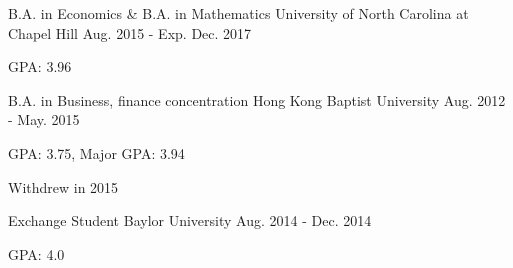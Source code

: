 

\begin{cventries}

  \cventry
    {B.A. in Economics & B.A. in Mathematics} %
    {University of North Carolina at Chapel Hill} %
    {Aug. 2015 - Exp. Dec. 2017} %
     {
      \begin{cvitems} %
        \item {GPA: 3.96}
      \end{cvitems}
    }


  \cventry
    {B.A. in Business, finance concentration} %
    {Hong Kong Baptist University} %
    {Aug. 2012 - May. 2015} %
    {
      \begin{cvitems} %
        \item {GPA: 3.75, Major GPA: 3.94}
        \item {Withdrew in 2015}
      \end{cvitems}
    }


\cventry
    {Exchange Student} %
    {Baylor University} %
    {Aug. 2014 - Dec. 2014} %
    {
      \begin{cvitems} %
        \item {GPA: 4.0}
      \end{cvitems}
    }



\end{cventries}
